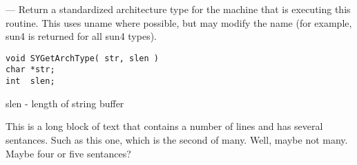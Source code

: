 \startmanpage
{}
--- Return a standardized architecture type for the machine that is executing this routine.  This uses uname where possible, but may modify the name (for example, sun4 is returned for all sun4 types). 
\startvb\begin{verbatim}
void SYGetArchType( str, slen )
char *str;
int  slen;
\end{verbatim}
\endvb

slen - length of string buffer
\par
{}
This is a long block of text that contains a number of lines
and has several sentances.  Such as this one, which is the
second of many.  Well, maybe not many.  Maybe four or
five sentances?
\par
{}
\endmanpage
